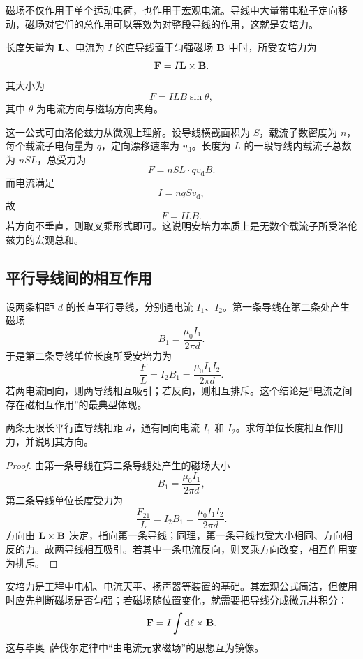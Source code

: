 磁场不仅作用于单个运动电荷，也作用于宏观电流。导线中大量带电粒子定向移动，磁场对它们的总作用可以等效为对整段导线的作用，这就是安培力。

\begin{law}[安培力公式]
长度矢量为 $\vb{L}$、电流为 $I$ 的直导线置于匀强磁场 $\vb{B}$ 中时，所受安培力为
\[
  \vb{F}=I\vb{L}\times\vb{B}.
\]
其大小为
\[
  F=ILB\sin\theta,
\]
其中 $\theta$ 为电流方向与磁场方向夹角。
\end{law}

这一公式可由洛伦兹力从微观上理解。设导线横截面积为 $S$，载流子数密度为 $n$，每个载流子电荷量为 $q$，定向漂移速率为 $v_\mathrm{d}$。长度为 $L$ 的一段导线内载流子总数为 $nSL$，总受力为
\[
  F=nSL\cdot qv_\mathrm{d}B.
\]
而电流满足
\[
  I=nqSv_\mathrm{d},
\]
故
\[
  F=ILB.
\]
若方向不垂直，则取叉乘形式即可。这说明安培力本质上是无数个载流子所受洛伦兹力的宏观总和。

\subsection*{平行导线间的相互作用}

设两条相距 $d$ 的长直平行导线，分别通电流 $I_1$、$I_2$。第一条导线在第二条处产生磁场
\[
  B_1=\frac{\mu_0 I_1}{2\pi d}.
\]
于是第二条导线单位长度所受安培力为
\[
  \frac{F}{L}=I_2B_1=\frac{\mu_0 I_1 I_2}{2\pi d}.
\]
若两电流同向，则两导线相互吸引；若反向，则相互排斥。这个结论是“电流之间存在磁相互作用”的最典型体现。

\begin{example}
两条无限长平行直导线相距 $d$，通有同向电流 $I_1$ 和 $I_2$。求每单位长度相互作用力，并说明其方向。
\end{example}

\begin{proof}
由第一条导线在第二条导线处产生的磁场大小
\[
  B_1=\frac{\mu_0 I_1}{2\pi d},
\]
第二条导线单位长度受力为
\[
  \frac{F_{21}}{L}=I_2B_1=\frac{\mu_0 I_1I_2}{2\pi d}.
\]
方向由 $\vb{L}\times\vb{B}$ 决定，指向第一条导线；同理，第一条导线也受大小相同、方向相反的力。故两导线相互吸引。若其中一条电流反向，则叉乘方向改变，相互作用变为排斥。
\end{proof}

\begin{remark}
安培力是工程中电机、电流天平、扬声器等装置的基础。其宏观公式简洁，但使用时应先判断磁场是否匀强；若磁场随位置变化，就需要把导线分成微元并积分：
\[
  \vb{F}=I\int \dd\vb{\ell}\times\vb{B}.
\]
这与毕奥--萨伐尔定律中“由电流元求磁场”的思想互为镜像。
\end{remark}

